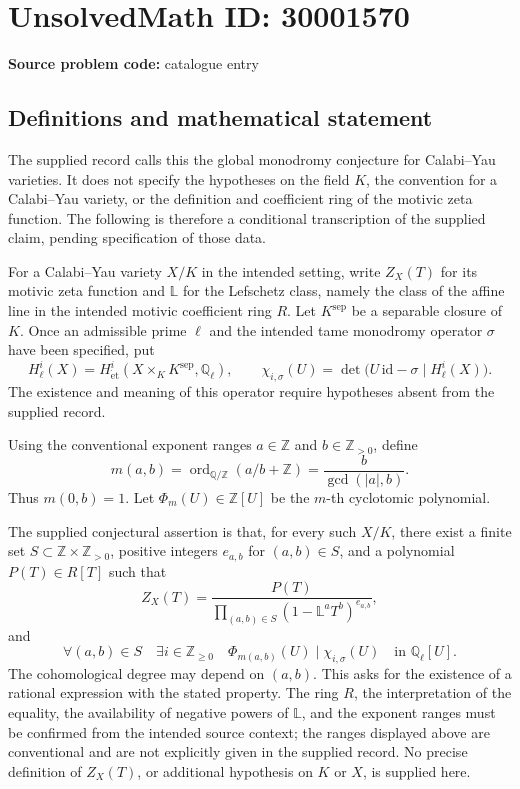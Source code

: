 \documentclass[11pt]{article}
\newcommand{\Z}{\mathbb{Z}}
\newcommand{\Q}{\mathbb{Q}}
\begin{document}
\section*{UnsolvedMath ID: 30001570}
\textbf{Source problem code:} catalogue entry
\subsection{Definitions and mathematical statement}
The supplied record calls this the global monodromy conjecture for Calabi--Yau varieties. It does not specify the hypotheses on the field \(K\), the convention for a Calabi--Yau variety, or the definition and coefficient ring of the motivic zeta function. The following is therefore a conditional transcription of the supplied claim, pending specification of those data.

For a Calabi--Yau variety \(X/K\) in the intended setting, write \(Z_X(T)\) for its motivic zeta function and \(\mathbb L\) for the Lefschetz class, namely the class of the affine line in the intended motivic coefficient ring \(R\). Let \(K^{\mathrm{sep}}\) be a separable closure of \(K\). Once an admissible prime \(\ell\) and the intended tame monodromy operator \(\sigma\) have been specified, put
\[
H^i_\ell(X)=H^i_{\mathrm{\acute et}}(X\times_K K^{\mathrm{sep}},\Q_\ell),\qquad
\chi_{i,\sigma}(U)=\det\bigl(U\,\mathrm{id}-\sigma\mid H^i_\ell(X)\bigr).
\]
The existence and meaning of this operator require hypotheses absent from the supplied record.

Using the conventional exponent ranges \(a\in\Z\) and \(b\in\Z_{>0}\), define
\[
m(a,b)=\operatorname{ord}_{\Q/\Z}(a/b+\Z)
=\frac{b}{\gcd(|a|,b)}.
\]
Thus \(m(0,b)=1\). Let \(\Phi_m(U)\in\Z[U]\) be the \(m\)-th cyclotomic polynomial.

The supplied conjectural assertion is that, for every such \(X/K\), there exist a finite set \(S\subset\Z\times\Z_{>0}\), positive integers \(e_{a,b}\) for \((a,b)\in S\), and a polynomial \(P(T)\in R[T]\) such that
\[
Z_X(T)=\frac{P(T)}{\displaystyle\prod_{(a,b)\in S}(1-\mathbb L^aT^b)^{e_{a,b}}},
\]
and
\[
\forall(a,b)\in S\quad\exists i\in\Z_{\geq0}\quad
\Phi_{m(a,b)}(U)\mid\chi_{i,\sigma}(U)
\quad\text{in }\Q_\ell[U].
\]
The cohomological degree may depend on \((a,b)\). This asks for the existence of a rational expression with the stated property. The ring \(R\), the interpretation of the equality, the availability of negative powers of \(\mathbb L\), and the exponent ranges must be confirmed from the intended source context; the ranges displayed above are conventional and are not explicitly given in the supplied record. No precise definition of \(Z_X(T)\), or additional hypothesis on \(K\) or \(X\), is supplied here.
\end{document}
